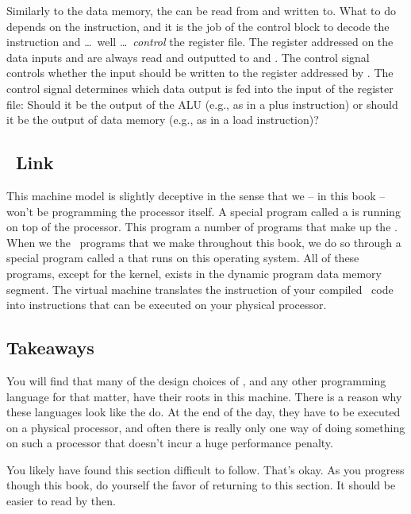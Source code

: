 Similarly to the data memory, the  can be read from and written to. What to do depends on the instruction, and it is the job of the control block to decode the instruction and \ldots\ well \ldots\ \textsl{control} the register file. The register addressed on the data inputs  and  are always read and outputted to  and . The  control signal controls whether the  input should be written to the register addressed by . The  control signal determines which data output is fed into the  input of the register file: Should it be the output of the ALU (e.g., as in a plus instruction) or should it be the output of data memory (e.g., as in a load instruction)?

\subsection{\csharp\ Link}

This machine model is slightly deceptive in the sense that we -- in this book -- won't be programming the processor itself. A special program called a  is running on top of the processor. This program  a number of programs that make up the . When we  the \csharp\ programs that we make throughout this book, we do so through a special program called a  that runs on this operating system. All of these programs, except for the kernel, exists in the dynamic program data memory segment. The virtual machine translates the  instruction of your compiled \csharp\ code into instructions that can be executed on your physical processor.

\subsection{Takeaways}

You will find that many of the design choices of \csharp, and any other programming language for that matter, have their roots in this machine. There is a reason why these languages look like the do. At the end of the day, they have to be executed on a physical processor, and often there is really only one way of doing something on such a processor that doesn't incur a huge performance penalty.

You likely have found this section difficult to follow. That's okay. As you progress though this book, do yourself the favor of returning to this section. It should be easier to read by then.

